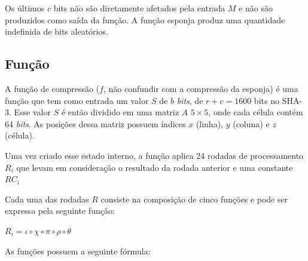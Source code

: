 Os últimos $c$ bits não são diretamente afetados pela entrada $M$ e não são
produzidos como saída da função. A função esponja produz uma quantidade
indefinida de bits aleatórios.

\subsection{Função \Keccak}

A função de compressão \Keccak ($f$, não confundir com a compressão da esponja)
é uma função que tem como entrada um valor $S$ de $b$ \textit{bits}, de
$r + c = 1600$ bits no SHA-3. Esse valor $S$ é então dividido em uma matriz $A$
$5 \times 5$, onde cada célula contém 64 \textit{bits}. As posições dessa
matriz possuem índices $x$ (linha), $y$ (coluna) e $z$ (célula).

Uma vez criado esse estado interno, a função aplica 24 rodadas de processamento
$R_{i}$ que levam em consideração o resultado da rodada anterior e uma
constante $RC_{i}$

Cada uma das rodadas $R$ consiste na composição de cinco funções e pode ser
expressa pela seguinte função:

\begin{center}
    $R_{i} = \iota \circ \chi \circ \pi \circ \rho \circ \theta$
\end{center}

As funções possuem a seguinte fórmula:

